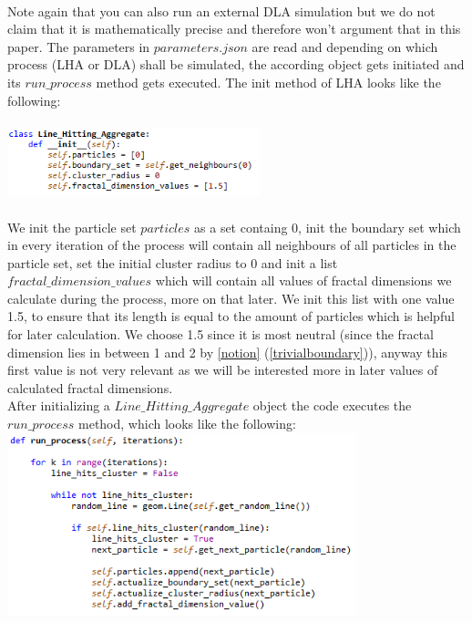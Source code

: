 \documentclass[12pt,a4paper]{scrartcl}
\numberwithin{equation}{subsection}
\newcommand{\1}{\mathbbm{1}}
\numberwithin{equation}{section}
\theoremstyle{definition}
\begin{document}
\\
Note again that you can also run an external DLA simulation but we do not claim that it is mathematically precise and therefore won't argument that in this paper. The parameters in $\mathit{parameters.json}$ are read and depending on which process (LHA or DLA) shall be simulated, the according object gets initiated and its $\mathit{run\_process}$ method gets executed. The init method of LHA looks like the following:\\
\\
\includegraphics[height=2cm]{images/code-snippets/lhainit.png} \\
\\
We init the particle set $\mathit{particles}$ as a set containg $0$, init the boundary set which in every iteration of the process will contain all neighbours of all particles in the particle set, set the initial cluster radius to $0$ and init a list $\mathit{fractal\_dimension\_values}$ which will contain all values of fractal dimensions we calculate during the process, more on that later. We init this list with one value 1.5, to ensure that its length is equal to the amount of particles which is helpful for later calculation. We choose 1.5 since it is most neutral (since the fractal dimension lies in between 1 and 2 by \ref{notion} (\ref{trivialboundary})), anyway this first value is not very relevant as we will be interested more in later values of calculated fractal dimensions. \\
After initializing a $\mathit{Line\_Hitting\_Aggregate}$ object the code executes the $\mathit{run\_process}$ method, which looks like the following:
\\
\includegraphics[height=5.3cm]{images/code-snippets/runprocess.png} \\
\end{document}
